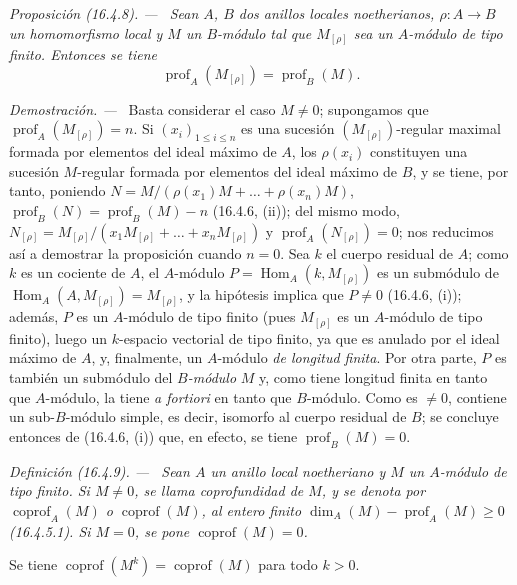 \documentclass[10pt,oneside]{book}
\makeatletter
\newcommand{\setmanualcurrentlabel}[1]{\def\@currentlabel{#1}}
\newenvironment{definition}[1][]{%
  \setmanualcurrentlabel{#1}\par\medskip\noindent\itshape Definición (#1). ---\ }{\par}
\newenvironment{proposition}[1][]{%
  \setmanualcurrentlabel{#1}\par\medskip\noindent\itshape Proposición (#1). ---\ }{\par}
\newenvironment{proof}{%
  \par\medskip\noindent\textit{Demostración. ---\ }}{\par}
\makeatother
\begin{document}
\begin{proposition}[16.4.8]
\label{0.16.4.8-es}
Sean $A$, $B$ dos anillos locales noetherianos,
$\rho:A\to B$ un homomorfismo local y $M$ un $B$-módulo tal que
$M_{[\rho]}$ sea un $A$-módulo de tipo finito. Entonces se tiene
\begin{equation}
\label{0.16.4.8.1-es}
\tag{16.4.8.1}
  \operatorname{prof}_A(M_{[\rho]})=\operatorname{prof}_B(M).
\end{equation}
\end{proposition}

\begin{proof}
Basta considerar el caso $M\neq0$; supongamos que
$\operatorname{prof}_A(M_{[\rho]})=n$. Si $(x_i)_{1\leq i\leq n}$ es una
sucesión $(M_{[\rho]})$-regular maximal formada por elementos del ideal máximo
de $A$, los $\rho(x_i)$ constituyen una sucesión $M$-regular formada por
elementos del ideal máximo de $B$, y se tiene, por tanto, poniendo
$N=M/(\rho(x_1)M+\ldots+\rho(x_n)M)$,
$\operatorname{prof}_B(N)=\operatorname{prof}_B(M)-n$ (16.4.6, (ii)); del
mismo modo,
$N_{[\rho]}=M_{[\rho]}/(x_1M_{[\rho]}+\ldots+x_nM_{[\rho]})$ y
$\operatorname{prof}_A(N_{[\rho]})=0$; nos reducimos así a demostrar la
proposición cuando $n=0$. Sea $k$ el cuerpo residual de $A$; como $k$ es un
cociente de $A$, el $A$-módulo
$P=\operatorname{Hom}_A(k,M_{[\rho]})$ es un submódulo de
$\operatorname{Hom}_A(A,M_{[\rho]})=M_{[\rho]}$, y la hipótesis implica que
$P\neq0$ (16.4.6, (i)); además, $P$ es un $A$-módulo de tipo finito
(pues $M_{[\rho]}$ es un $A$-módulo de tipo finito), luego un $k$-espacio
vectorial de tipo finito, ya que es anulado por el ideal máximo de $A$, y,
finalmente, un $A$-módulo \emph{de longitud finita}. Por otra parte, $P$ es también un
submódulo del \emph{$B$-módulo} $M$ y, como tiene longitud finita en tanto que
$A$-módulo, la tiene \emph{a fortiori} en tanto que $B$-módulo. Como es
$\neq0$, contiene un sub-$B$-módulo simple, es decir, isomorfo al cuerpo
residual de $B$; se concluye entonces de (16.4.6, (i)) que, en efecto, se tiene
$\operatorname{prof}_B(M)=0$.
\end{proof}

\begin{definition}[16.4.9]
\label{0.16.4.9-es}
Sean $A$ un anillo local noetheriano y $M$ un $A$-módulo de tipo finito. Si
$M\neq0$, se llama coprofundidad de $M$, y se denota por
$\operatorname{coprof}_A(M)$ o $\operatorname{coprof}(M)$, al entero finito
$\dim_A(M)-\operatorname{prof}_A(M)\geq0$ (16.4.5.1). Si $M=0$, se pone
$\operatorname{coprof}(M)=0$.

Se tiene $\operatorname{coprof}(M^k)=\operatorname{coprof}(M)$ para todo
$k>0$.
\end{definition}
\end{document}
